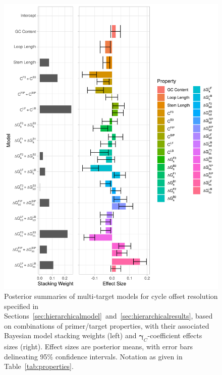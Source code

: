 \documentclass[../thesis.tex]{subfiles}
\begin{document}
\begin{figure}[!tpb] 
\centering
\includegraphics[width=5in]{../figures/chapter2/paper_eval_fig.png}
\caption{Posterior summaries of multi-target models for cycle offset resolution specified in Sections~\ref{sec:hierarchicalmodel}~and~\ref{sec:hierarchicalresults}, based on combinations of primer/target properties, with their associated Bayesian model stacking weights (left) and $\bm{\gamma}_C$-coefficient effects sizes (right). Effect sizes are posterior means, with error bars delineating 95\% confidence intervals. Notation as given in Table~\ref{tab:properties}.\label{fig:hierarchical_stacking_c}}
\end{figure}
\end{document}
